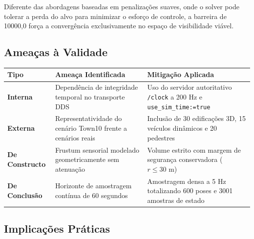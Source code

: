 \documentclass[
  brazilian,
  a4paper]{article}
\newcounter{none} %
\begin{document}
Diferente das abordagens baseadas em penalizações suaves, onde o solver
pode tolerar a perda do alvo para minimizar o esforço de controle, a
barreira de 10000,0 força a convergência exclusivamente no espaço de
visibilidade viável.

\subsection{Ameaças à Validade}\label{ameauxe7as-uxe0-validade}

{\def\LTcaptype{none} %
\begin{longtable}[]{@{}
  >{\raggedright\arraybackslash}p{}
  >{\raggedright\arraybackslash}p{}
  >{\raggedright\arraybackslash}p{}@{}}
\toprule\noalign{}
\begin{minipage}[b]{\linewidth}\raggedright
Tipo
\end{minipage} & \begin{minipage}[b]{\linewidth}\raggedright
Ameaça Identificada
\end{minipage} & \begin{minipage}[b]{\linewidth}\raggedright
Mitigação Aplicada
\end{minipage} \\
\midrule\noalign{}
\endhead
\bottomrule\noalign{}
\endlastfoot
\textbf{Interna} & Dependência de integridade temporal no transporte DDS
& Uso do servidor autoritativo \texttt{/\allowbreak{}clock} a 200 Hz e
\texttt{use\_\allowbreak{}sim\_\allowbreak{}time:\allowbreak{}=true} \\
\textbf{Externa} & Representatividade do cenário Town10 frente a
cenários reais & Inclusão de 30 edificações 3D, 15 veículos dinâmicos e
20 pedestres \\
\textbf{De Constructo} & Frustum sensorial modelado geometricamente sem
atenuação & Volume estrito com margem de segurança conservadora
(\(r \le 30\text{ m}\)) \\
\textbf{De Conclusão} & Horizonte de amostragem contínua de 60 segundos
& Amostragem densa a 5 Hz totalizando 600 poses e 3001 amostras de
estado \\
\end{longtable}
}

\subsection{Implicações Práticas}\label{implicauxe7uxf5es-pruxe1ticas}
\end{document}
